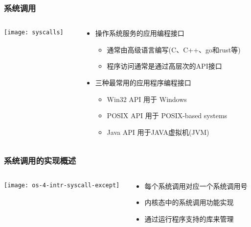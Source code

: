 \begin{frame}
	\frametitle{系统调用}
	
	
	\begin{columns}
		
		\begin{column}{0.4\textwidth}
			\centering
			\texttt{[image: syscalls]}
			
			
		\end{column}
		
		\begin{column}{0.5\textwidth}
			
			\begin{itemize}
				\item 操作系统服务的应用编程接口
				\begin{itemize}
					\item 通常由高级语言编写(C、C++、go和rust等)
					\item 程序访问通常是通过高层次的API接口
				\end{itemize}
				\item 三种最常用的应用程序编程接口
				\begin{itemize}
					\item Win32 API 用于 Windows
					\item POSIX API 用于 POSIX-based systems
					\item Java API 用于JAVA虚拟机(JVM)
				\end{itemize}
			\end{itemize}
			
		\end{column}
	\end{columns}
	
\end{frame}

\begin{frame}[plain]
	\frametitle{系统调用的实现概述}
	\begin{columns}
		
		\begin{column}{0.45\textwidth}
			\centering
			\texttt{[image: os-4-intr-syscall-except]}
			
		\end{column}
		
		\begin{column}{0.5\textwidth}
			
			\begin{itemize}  
				\item 每个系统调用对应一个系统调用号
				\item 内核态中的系统调用功能实现
				\item 通过运行程序支持的库来管理
				
			\end{itemize}
			
		\end{column}
		
	\end{columns}
	
\end{frame}


